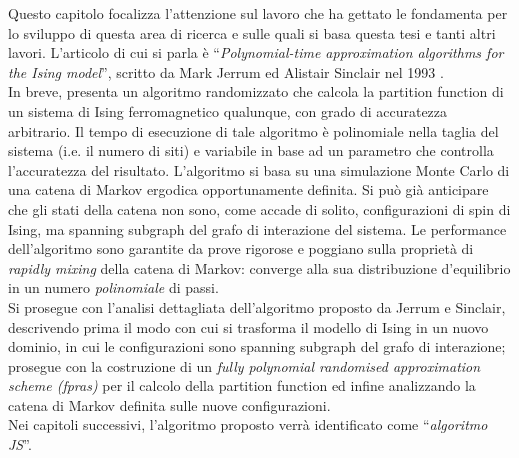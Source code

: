 Questo capitolo focalizza l'attenzione sul lavoro che ha gettato le fondamenta per lo sviluppo di questa area di ricerca e sulle quali si basa questa tesi e tanti altri lavori. L'articolo di cui si parla è ``\textit{Polynomial-time approximation algorithms for the Ising model}'', scritto da Mark Jerrum ed Alistair Sinclair nel 1993 \cite{jerrum1993polynomial}.\\
In breve, \cite{jerrum1993polynomial} presenta un algoritmo randomizzato che calcola la partition function di un sistema di Ising ferromagnetico qualunque, con grado di accuratezza arbitrario. Il tempo di esecuzione di tale algoritmo è polinomiale nella taglia del sistema (i.e. il numero di siti) e variabile in base ad un parametro che controlla l'accuratezza del risultato.
L'algoritmo si basa su una simulazione Monte Carlo di una catena di Markov ergodica opportunamente definita. Si può già anticipare che gli stati della catena non sono, come accade di solito, configurazioni di spin di Ising, ma spanning subgraph del grafo di interazione del sistema. Le performance dell'algoritmo sono garantite da prove rigorose e poggiano sulla proprietà di \textit{rapidly mixing} della catena di Markov: converge alla sua distribuzione d'equilibrio in un numero \textit{polinomiale} di passi.\\
Si prosegue con l'analisi dettagliata dell'algoritmo proposto da Jerrum e Sinclair, descrivendo prima il modo con cui si trasforma il modello di Ising in un nuovo dominio, in cui le configurazioni sono spanning subgraph del grafo di interazione; prosegue con la costruzione di un \textit{fully polynomial randomised approximation scheme (fpras)} per il calcolo della partition function ed infine analizzando la catena di Markov definita sulle nuove configurazioni.\\
Nei capitoli successivi, l'algoritmo proposto verrà identificato come ``\textit{algoritmo JS}''.
